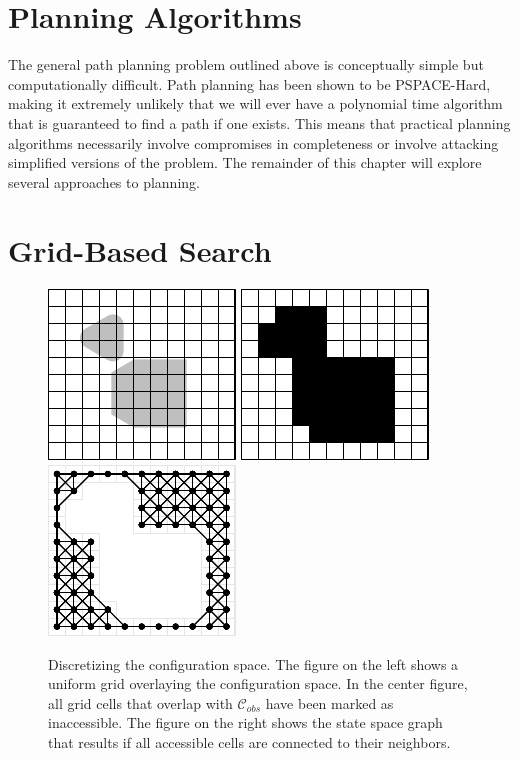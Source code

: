 \section{Planning Algorithms}

The general path planning problem outlined above is conceptually
simple but computationally difficult.  Path planning has been shown to
be PSPACE-Hard, making it extremely unlikely that we will ever have a
polynomial time algorithm that is guaranteed to find a path if one
exists.  This means that practical planning algorithms necessarily
involve compromises in completeness or involve attacking simplified
versions of the problem.  The remainder of this chapter will explore
several approaches to planning.


\section{Grid-Based Search}
\label{sec:graph_search}


\begin{figure}
\begin{center}
\includegraphics[]{planning/figs/grid1.pdf} \hspace{1em}
\includegraphics[]{planning/figs/grid2.pdf} \hspace{1em}
\includegraphics[]{planning/figs/grid3.pdf}
\end{center}
\caption{Discretizing the configuration space.  The figure on the left
  shows a uniform grid overlaying the configuration space.  In the
  center figure, all grid cells that overlap with $\mathcal{C}_{obs}$
  have been marked as inaccessible.  The figure on the right shows the
  state space graph that results if all accessible cells are connected
  to their neighbors. }
\label{fig:discretization}
\end{figure}


